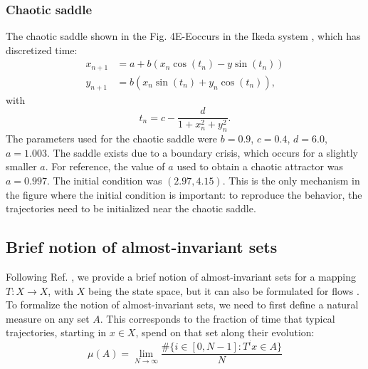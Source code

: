 
\subsubsection{Chaotic saddle}
The chaotic saddle shown in the Fig. 4E-E\ssupprime occurs in the Ikeda system \cite{alligood1997book}, which has discretized time:
\begin{align}
    x_{n+1} &= a+b(x_n \cos(t_n) - y \sin(t_n)) \\ 
    y_{n+1} &= b(x_n \sin(t_n) + y_n \cos(t_n)),  
\end{align}
with 
\begin{equation}
    t_n = c - \frac{d}{1 + x_n^2 + y_n^2}.
\end{equation}
The parameters used for the chaotic saddle were $b = 0.9$, $c = 0.4$, $d = 6.0$, $a = 1.003$. The saddle exists due to a boundary crisis, which occurs for a slightly smaller $a$. For reference, the value of $a$ used to obtain a chaotic attractor was $a = 0.997$. The initial condition was $(2.97, 4.15)$. This is the only mechanism in the figure where the initial condition is important: to reproduce the behavior, the trajectories need to be initialized near the chaotic saddle.

\subsection*{Brief notion of almost-invariant sets} \label{sec:brief-notion}
Following Ref. \cite{froyland2005statistically}, we provide a brief notion of almost-invariant sets for a mapping $T : X \to X$, with $X$ being the state space, but it can also be formulated for flows \cite{froyland2009almost}. To formalize the notion of almost-invariant sets, we need to first define a natural measure on any set $A$. This corresponds to the fraction of time that typical trajectories, starting in $x \in X$, spend on that set along their evolution:
\begin{equation}
    \mu (A) = \lim_{N\to\infty} \frac{\# \{i \in [0, N-1] : T^i x \in A \} }{N}
\end{equation}

